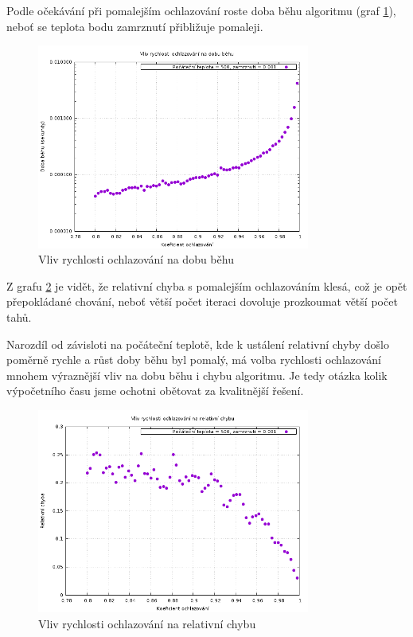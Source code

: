 \documentclass[11pt]{article}
\begin{document}
Podle očekávání při pomalejším ochlazování roste doba běhu algoritmu (graf \ref{fig:cool}), neboť se teplota bodu zamrznutí přibližuje pomaleji.

\begin{figure}[h!]
	\centering
    	\includegraphics[width=0.8\textwidth]{../grafy/cool.png}
	\caption{Vliv rychlosti ochlazování na dobu běhu}
	\label{fig:cool}
\end{figure}

Z grafu \ref{fig:cool_e} je vidět, že relativní chyba s pomalejším ochlazováním klesá, což je opět přepokládané chování, neboť větší počet iteraci dovoluje prozkoumat větší počet tahů.

Narozdíl od závisloti na počáteční teplotě, kde k ustálení relativní chyby došlo poměrně rychle a růst doby běhu byl pomalý, má volba rychlosti ochlazování mnohem výraznější vliv na dobu běhu i chybu algoritmu. Je tedy otázka kolik výpočetního času jsme ochotni obětovat za kvalitnější řešení.

\begin{figure}[h!]
	\centering
    	\includegraphics[width=0.8\textwidth]{../grafy/cool_e.png}
	\caption{Vliv rychlosti ochlazování na relativní chybu}
	\label{fig:cool_e}
\end{figure}
\end{document}
